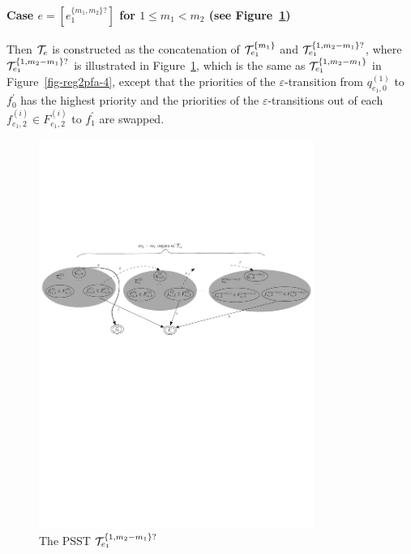 \paragraph{Case $e = [e_1^{\{m_1,m_2\}?}]$ for $1 \le m_1 < m_2$ (see Figure~\ref{fig-reg2pfa-5})} Then $\mathcal{T}_e$ is constructed as the concatenation of $\mathcal{T}^{\{m_1\}}_{e_1}$ and $\mathcal{T}^{\{1,m_2-m_1\}?}_{e_1}$, where $\mathcal{T}^{\{1,m_2-m_1\}?}_{e_1}$ is illustrated in Figure~\ref{fig-reg2pfa-5}, which is the same as $\mathcal{T}^{\{1,m_2-m_1\}}_{e_1}$ in Figure~\ref{fig-reg2pfa-4}, except that the priorities of the $\varepsilon$-transition from $q^{(1)}_{e_1,0}$ to $f^\prime_0$ has the highest priority and  the priorities of the $\varepsilon$-transitions out of each $f^{(i)}_{e_1,2} \in F^{(i)}_{e_1,2}$ to $f^\prime_1$ are swapped.
\begin{figure}[ht]
	\centering
	\includegraphics[width = 0.8\textwidth]{reg2pfa-5.pdf}
	\caption{The PSST $\mathcal{T}^{\{1,m_2-m_1\}?}_{e_1}$}
	\label{fig-reg2pfa-5}
\end{figure} 

